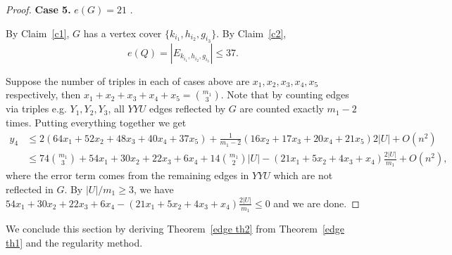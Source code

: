 \documentclass[11pt, reqno]{amsart}    	%
\theoremstyle{definition}
\numberwithin{equation}{section}
\begin{document}
\begin{proof}
		
		
		
		\textbf{Case 5.} $ e(G)=21$ .
		
		By Claim~\ref{c1}, $G$ has a vertex cover $\{k_{i_{1}},h_{i_{2}},g_{i_{3}}\}$. By Claim~\ref{c2}, 
		\[e(Q)=|E_{k_{i_{1}},h_{i_{2}},g_{i_{3}}}|\le37.\]
		
		
		\medskip
		Suppose the number of triples in each of cases above are $x_1,x_2,x_3,x_4,x_5$ respectively,  then $x_1+x_2+x_3+x_4+x_5=\binom{m_1}{3}$. 
		Note that by counting edges via triples e.g. $Y_1,Y_2, Y_3$, all $YYU$ edges reflected by $G$ are counted exactly $m_1-2$ times. Putting everything together we get 
		\[\begin{split}y_{4}&\le 	2 (64x_1+52x_2+48x_3+40x_4+ 37x_5)+\frac{1}{m_1-2}(16x_2+17x_3+20x_4+21x_5)2|U|+O(n^2) \\
			&\le 74\binom{m_1}{3} + 54x_1+30x_2+22x_3+6x_4 +14\binom{m_1}{2}|U| - (21x_1+5x_2+4x_3+x_4)\frac{2|U|}{m_1} + O(n^2),
		\end{split}\]
		where the error term comes from the remaining edges in  $ YYU $ which are not reflected in $G$.
		By $|U|/m_1\ge 3$, we have $54x_1+30x_2+22x_3+6x_4 - (21x_1+5x_2+4x_3+x_4)\frac{2|U|}{m_1}\le 0$ and we are done.
	\end{proof}
	
	
	We conclude this section by deriving Theorem~\ref{edge th2} from Theorem~\ref{edge th1} and the regularity method.
	
\end{document}
